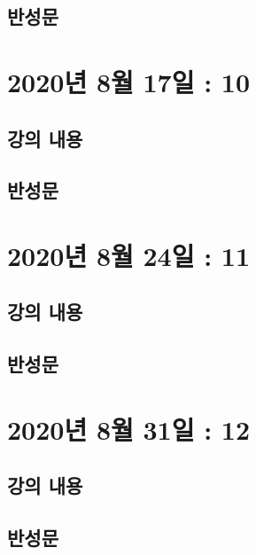 \documentclass[12pt, a4paper, oneside]{book}
\let\stdsection\section
\renewcommand\section{\newpage\stdsection}
\begin{document}
		\subsection{반성문}


%
	\section{2020년 8월 17일 : 10}

		\subsection{강의 내용}

		\subsection{반성문}

%
	\section{2020년 8월 24일 : 11}

		\subsection{강의 내용}

		\subsection{반성문}


%
	\section{2020년 8월 31일 : 12}

		\subsection{강의 내용}

		\subsection{반성문}





\end{document}
